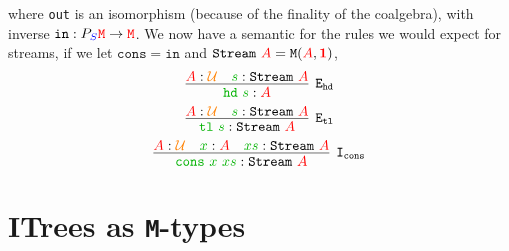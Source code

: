 \documentclass[twoside,11pt,openright]{report}
\newcommand*{\term}[1]{\textcolor{green!70!black}{#1}}
\newcommand*{\type}[1]{\textcolor{red}{#1}}
\newcommand*{\container}[1]{\textcolor{blue}{#1}}
\newcommand*{\universe}[1]{\textcolor{orange}{#1}}
\newcommand*{\unit}{\type{\textbf{1}}}
\begin{document}
where \texttt{out} is an isomorphism (because of the finality of the coalgebra), with inverse \(\mathtt{in} : P_{\container{S}}\type{\mathtt{M}} \rightarrow \type{\mathtt{M}}\). We now have a semantic for the rules we would expect for streams, if we let \(\mathtt{cons} = \mathtt{in}\) and \(\mathtt{Stream}~\type{A} = \mathtt{M}(\type{A},\unit)\),
\begin{equation}
  \infer[\mathtt{E}_{\mathtt{hd}}]{\term{\mathtt{hd}}~\term{s} : \type{A}}{\type{A} : \universe{\mathcal{U}} & \term{s} : \mathtt{Stream}~\type{A}}
\end{equation}
\begin{equation}
  \infer[\mathtt{E}_{\mathtt{tl}}]{\term{\mathtt{tl}}~\term{s} : \mathtt{Stream}~\type{A}}{\type{A} : \universe{\mathcal{U}} & \term{s} : \mathtt{Stream}~\type{A}}
\end{equation}
\begin{equation}
  \infer[\mathtt{I}_{\mathtt{cons}}]{\term{\mathtt{cons}}~\term{x}~\term{xs} : \mathtt{Stream}~\type{A}}{\type{A} : \universe{\mathcal{U}} & \term{x} : \type{A} & \term{xs} : \mathtt{Stream}~\type{A}}
\end{equation}

\section{ITrees as \texttt{M}-types}
\end{document}
